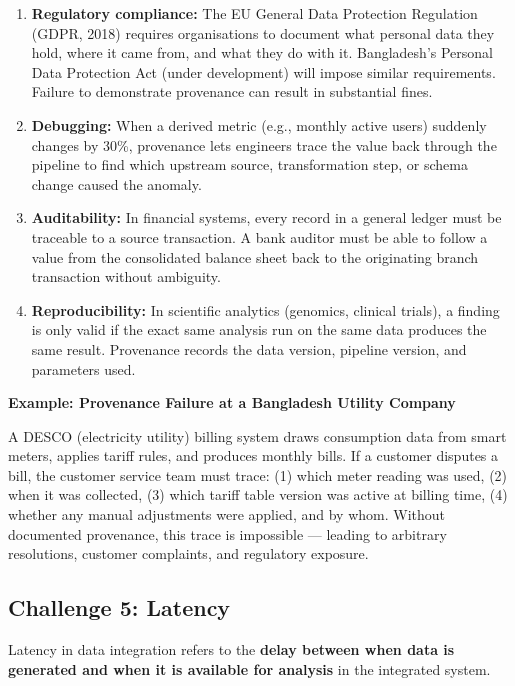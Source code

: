 \documentclass[12pt,a4paper]{article}
\newcommand{\examplebox}[2]{%
  \noindent
  \colorbox{PUTeal!10}{%
    \begin{minipage}{\dimexpr\linewidth-2\fboxsep}
      \vspace{4pt}\textbf{\textcolor{PUTeal}{Example: #1}}\par\vspace{2pt}
      #2\vspace{4pt}
    \end{minipage}%
  }\par\vspace{6pt}%
}
\begin{document}
\begin{enumerate}[leftmargin=2em, itemsep=6pt]
  \item \textbf{Regulatory compliance:}  The EU General Data Protection Regulation (GDPR, 2018) requires organisations to document what personal data they hold, where it came from, and what they do with it.  Bangladesh's Personal Data Protection Act (under development) will impose similar requirements.  Failure to demonstrate provenance can result in substantial fines.

  \item \textbf{Debugging:}  When a derived metric (e.g., monthly active users) suddenly changes by 30\%, provenance lets engineers trace the value back through the pipeline to find which upstream source, transformation step, or schema change caused the anomaly.

  \item \textbf{Auditability:}  In financial systems, every record in a general ledger must be traceable to a source transaction.  A bank auditor must be able to follow a value from the consolidated balance sheet back to the originating branch transaction without ambiguity.

  \item \textbf{Reproducibility:}  In scientific analytics (genomics, clinical trials), a finding is only valid if the exact same analysis run on the same data produces the same result.  Provenance records the data version, pipeline version, and parameters used.
\end{enumerate}

\examplebox{Provenance Failure at a Bangladesh Utility Company}{A DESCO (electricity utility) billing system draws consumption data from smart meters, applies tariff rules, and produces monthly bills.  If a customer disputes a bill, the customer service team must trace: (1) which meter reading was used, (2) when it was collected, (3) which tariff table version was active at billing time, (4) whether any manual adjustments were applied, and by whom.  Without documented provenance, this trace is impossible --- leading to arbitrary resolutions, customer complaints, and regulatory exposure.}

\subsection{Challenge 5: Latency}

Latency in data integration refers to the \textbf{delay between when data is generated and when it is available for analysis} in the integrated system.
\end{document}
